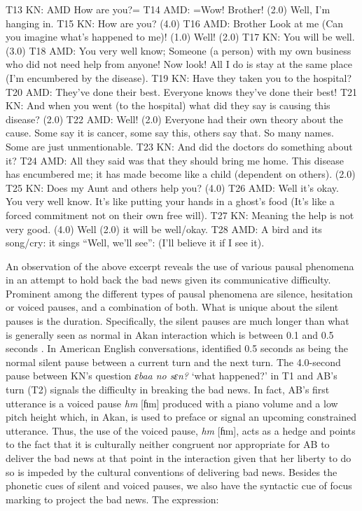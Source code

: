 \documentclass[output=paper,colorlinks,citecolor=brown]{langscibook}
\begin{document}
\begin{exe}
     T13 KN: AMD How are you?=
     T14 AMD: =Wow! Brother! (2.0) Well, I’m hanging in.
     T15 KN: How are you? (4.0)
     T16 AMD: Brother Look at me (Can you imagine what’s happened to me)! (1.0) Well! (2.0)
     T17 KN: You will be well. (3.0)
     T18 AMD: You very well know; Someone (a person) with my own business who did not need help from anyone! Now look! All I do is stay at the same place (I’m encumbered by the disease).
     T19 KN: Have they taken you to the hospital?
     T20 AMD: They’ve done their best. Everyone knows they’ve done their best!
     T21 KN: And when you went (to the hospital) what did they say is causing this disease? (2.0)
     T22 AMD: Well! (2.0) Everyone had their own theory about the cause. Some say it is cancer, some say this, others say that. So many names. Some are just unmentionable.
     T23 KN: And did the doctors do something about it?
     T24 AMD: All they said was that they should bring me home. This disease has encumbered me; it has made become like a child (dependent on others). (2.0)
     T25 KN: Does my Aunt and others help you? (4.0)
     T26 AMD: Well it’s okay. You very well know. It’s like putting your hands in a ghost’s food (It’s like a forced commitment not on their own free will).
     T27 KN: Meaning the help is not very good. (4.0) Well (2.0) it will be well\slash okay.
     T28 AMD: A bird and its song/cry: it sings “Well, we’ll see'': (I’ll believe it if I see it).
\end{exe}

An observation of the above excerpt reveals the use of various pausal phenomena in an attempt to hold back the bad news given its communicative difficulty. Prominent among the different types of pausal phenomena are silence, hesitation or voiced pauses, and a combination of both. What is unique about the silent pauses is the duration. Specifically, the silent pauses are much longer than what is generally seen as normal in Akan interaction which is between 0.1 and 0.5 seconds \citep{Obeng1987, Obeng1989, Obeng1999} . In American English conversations, \citet{jefferson1983} identified 0.5 seconds as being the normal silent pause between a current turn and the next turn. The 4.0-second pause between KN’s question \textit{ɛbaa no sɛn?} ‘what happened?’ in T1 and AB’s turn (T2) signals the difficulty in breaking the bad news. In fact, AB’s first utterance is a voiced pause \textit{hm} [ɦm] produced with a piano volume and a low pitch height which, in Akan, is used to preface or signal an upcoming constrained utterance. Thus, the use of the voiced pause, \textit{hm} [ɦm], acts as a hedge and points to the fact that it is culturally neither congruent nor appropriate for AB to deliver the bad news at that point in the interaction given that her liberty to do so is impeded by the cultural conventions of delivering bad news. Besides the phonetic cues of silent and voiced pauses, we also have the syntactic cue of focus marking to project the bad news. The expression:
\end{document}
